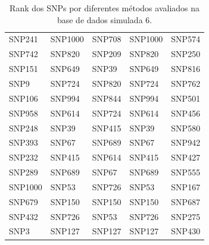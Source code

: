 \begin{table}[ht]
\begin{tabular}{lllll}
  SNP241 & SNP1000 & SNP708 & SNP1000 & SNP574 \\ 
  SNP742 & SNP820 & SNP209 & SNP820 & SNP250 \\ 
  SNP151 & SNP649 & SNP39 & SNP649 & SNP816 \\ 
  SNP9 & SNP724 & SNP820 & SNP724 & SNP762 \\ 
  SNP106 & SNP994 & SNP844 & SNP994 & SNP501 \\ 
  SNP958 & SNP614 & SNP724 & SNP614 & SNP456 \\ 
  SNP248 & SNP39 & SNP415 & SNP39 & SNP580 \\ 
  SNP393 & SNP67 & SNP689 & SNP67 & SNP942 \\ 
  SNP232 & SNP415 & SNP614 & SNP415 & SNP427 \\ 
  SNP289 & SNP689 & SNP67 & SNP689 & SNP555 \\ 
  SNP1000 & SNP53 & SNP726 & SNP53 & SNP167 \\ 
  SNP679 & SNP150 & SNP150 & SNP150 & SNP687 \\ 
  SNP432 & SNP726 & SNP53 & SNP726 & SNP275 \\ 
  SNP3 & SNP127 & SNP127 & SNP127 & SNP430 \\ 
   \hline
\end{tabular}
\caption{Rank dos SNPs por diferentes métodos avaliados na base de dados simulada 6.} 
\label{tab:ranks}
\end{table}
